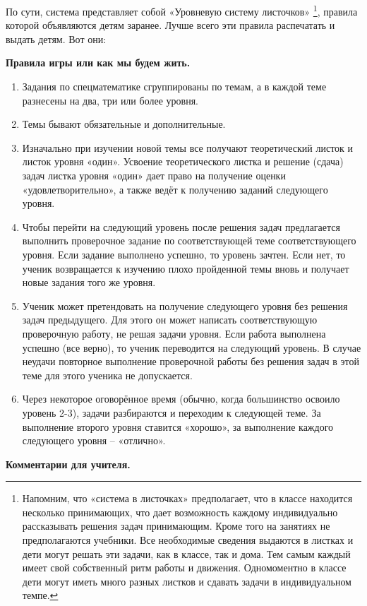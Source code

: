 	По сути, система представляет собой «Уровневую систему листочков» \footnote{ Напомним, что «система в листочках» предполагает, что в классе находится несколько принимающих, что дает возможность каждому индивидуально рассказывать решения задач принимающим. Кроме того на занятиях не предполагаются учебники. Все необходимые сведения выдаются в листках и дети могут решать эти задачи, как в классе, так и дома. Тем самым каждый имеет свой собственный ритм работы и движения. Одномоментно в классе дети могут иметь много разных листков и сдавать задачи в индивидуальном темпе.}, правила которой объявляются детям заранее.	Лучше всего эти правила распечатать и выдать детям. Вот они:
	\begin{center}
		\textbf{Правила игры или как мы будем жить.}
	\end{center}
\begin{enumerate}
	\item Задания по спецматематике сгруппированы по темам, а в каждой теме разнесены на два, три или более уровня.
	\item Темы бывают обязательные и дополнительные. 
	\item Изначально при изучении новой темы все получают теоретический листок и листок уровня «один». Усвоение теоретического листка и решение (сдача) задач листка уровня «один» дает право на получение оценки «удовлетворительно», а также ведёт к  получению заданий следующего уровня.
	\item Чтобы перейти на следующий уровень после решения задач предлагается выполнить проверочное задание по соответствующей теме соответствующего уровня. Если задание выполнено успешно, то уровень зачтен. Если нет, то ученик возвращается к изучению плохо пройденной темы вновь и получает новые задания того же уровня.
	\item Ученик может претендовать на получение следующего уровня без решения задач предыдущего. Для этого он может написать соответствующую проверочную работу, не решая задачи уровня. Если работа выполнена успешно (все верно), то ученик переводится на следующий уровень. В случае неудачи повторное выполнение проверочной работы без решения задач в этой теме для этого ученика не допускается.
	\item Через некоторое оговорённое время (обычно, когда большинство освоило уровень 2-3), задачи разбираются и переходим к следующей теме. За выполнение второго уровня ставится «хорошо», за выполнение каждого следующего уровня – «отлично».
	\end{enumerate}
\newpage
\begin{center}
	\textbf{Комментарии для учителя.}
\end{center}

